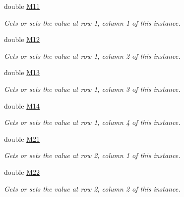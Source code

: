 \begin{DoxyCompactItemize}
double \hyperlink{struct_open_t_k_1_1_matrix4d_ac128dd5c0aaa0eb15ce4b49149a2d5c2}{M11}
\begin{DoxyCompactList}\small\item\em Gets or sets the value at row 1, column 1 of this instance. \end{DoxyCompactList}\item 
double \hyperlink{struct_open_t_k_1_1_matrix4d_a74e96dc417aab993d5f4b92c3c014cf0}{M12}
\begin{DoxyCompactList}\small\item\em Gets or sets the value at row 1, column 2 of this instance. \end{DoxyCompactList}\item 
double \hyperlink{struct_open_t_k_1_1_matrix4d_a70b35dc2bb2896a3ef37f804002e0aa7}{M13}
\begin{DoxyCompactList}\small\item\em Gets or sets the value at row 1, column 3 of this instance. \end{DoxyCompactList}\item 
double \hyperlink{struct_open_t_k_1_1_matrix4d_a351c8abae76bbb11fe14a17ba361e96e}{M14}
\begin{DoxyCompactList}\small\item\em Gets or sets the value at row 1, column 4 of this instance. \end{DoxyCompactList}\item 
double \hyperlink{struct_open_t_k_1_1_matrix4d_aae11cc1c0ea152a6b62fe9e846989dc0}{M21}
\begin{DoxyCompactList}\small\item\em Gets or sets the value at row 2, column 1 of this instance. \end{DoxyCompactList}\item 
double \hyperlink{struct_open_t_k_1_1_matrix4d_abb1e0debae03676f435ba7e219e36070}{M22}
\begin{DoxyCompactList}\small\item\em Gets or sets the value at row 2, column 2 of this instance. \end{DoxyCompactList}\item 

\end{DoxyCompactItemize}
